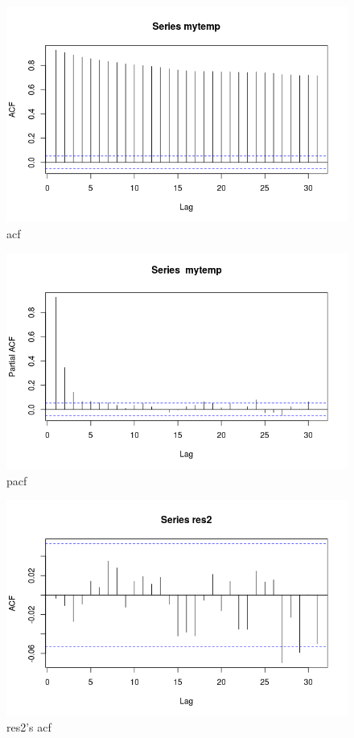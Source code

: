 \documentclass[a4paper,10pt]{article}
\begin{document}
\begin{figure}[H]
\centering
\caption{acf}
\includegraphics[scale=.40]{mytemp_acf.png}
\end{figure}

\begin{figure}[H]
\centering
\caption{pacf}
\includegraphics[scale=.40]{mytemp_pacf.png}
\end{figure}


\begin{figure}[H]
\centering
\caption{res2's acf}
\includegraphics[scale=.40]{res2_acf.png}
\end{figure}
\end{document}
